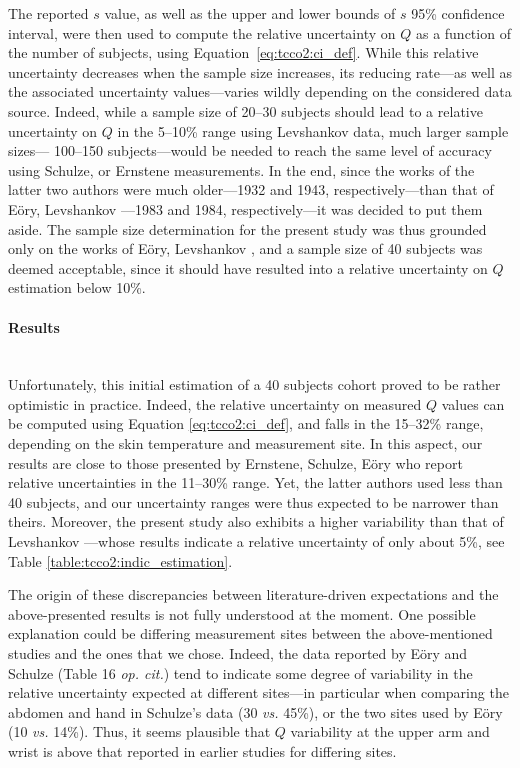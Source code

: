 The reported $s$ value, as well as the upper and lower bounds of $s$ 95\% confidence interval, were then used to compute the relative uncertainty on $Q$ as a function of the number of subjects, using Equation~\ref{eq:tcco2:ci_def}. While this relative uncertainty decreases when the sample size increases, its reducing rate---as well as the associated uncertainty values---varies wildly depending on the considered data source. Indeed, while a sample size of 20--30 subjects should lead to a relative uncertainty on $Q$ in the 5--10\% range using Levshankov \etal{} data, much larger sample sizes---\ie{} 100--150 subjects---would be needed to reach the same level of accuracy using Schulze, or Ernstene \etal{} measurements. In the end, since the works of the latter two authors were much older---1932 and 1943, respectively---than that of Eöry, Levshankov \etal{}---1983 and 1984, respectively---it was decided to put them aside. The sample size determination for the present study was thus grounded only on the works of Eöry, Levshankov \etal{}, and a sample size of 40 subjects was deemed acceptable, since it should have resulted into a relative uncertainty on $Q$ estimation below 10\%.

\paragraph{Results}\label{subsect:tcco2:ss_result}\mbox{}\\

Unfortunately, this initial estimation of a 40 subjects cohort proved to be rather optimistic in practice. Indeed, the relative uncertainty on measured $Q$ values can be computed using Equation \ref{eq:tcco2:ci_def}, and falls in the 15--32\% range, depending on the skin temperature and measurement site. In this aspect, our results are close to those presented by Ernstene, Schulze, Eöry \etal{}\cite{ernstene1932a, schulze1943, eory1984} who report relative uncertainties in the 11--30\% range. Yet, the latter authors used less than 40 subjects, and our uncertainty ranges were thus expected to be narrower than theirs. Moreover, the present study also exhibits a higher variability than that of Levshankov \etal{}\cite{levshankov1983}---whose results indicate a relative uncertainty of only about 5\%, see Table \ref{table:tcco2:indic_estimation}.

The origin of these discrepancies between literature-driven expectations and the above-presen\-ted results is not fully understood at the moment. One possible explanation could be differing measurement sites between the above-mentioned studies and the ones that we chose. Indeed, the data reported by Eöry and Schulze (Table 16 \textit{op. cit.}) tend to indicate some degree of variability in the relative uncertainty expected at different sites---in particular when comparing the abdomen and hand in Schulze's data (30 \textit{vs.} 45\%), or the two sites used by Eöry (10 \textit{vs.} 14\%). Thus, it seems plausible that $Q$ variability at the upper arm and wrist is above that reported in earlier studies for differing sites.

